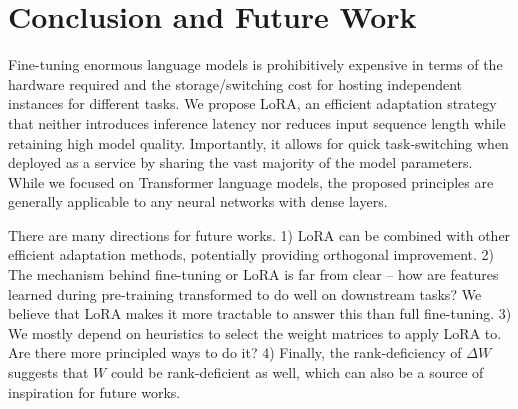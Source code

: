 \section{Conclusion and Future Work}

Fine-tuning enormous language models is prohibitively expensive in terms of the hardware required and the storage/switching cost for hosting independent instances for different tasks. We propose LoRA, an efficient adaptation strategy that neither introduces inference latency nor reduces input sequence length while retaining high model quality. Importantly, it allows for quick task-switching when deployed as a service by sharing the vast majority of the model parameters. While we focused on Transformer language models, the proposed principles are generally applicable to any neural networks with dense layers.

There are many directions for future works. 1) LoRA can be combined with other efficient adaptation methods, potentially providing orthogonal improvement. 2) The mechanism behind fine-tuning or LoRA is far from clear -- how are features learned during pre-training transformed to do well on downstream tasks? We believe that LoRA makes it more tractable to answer this than full fine-tuning. 3) We mostly depend on heuristics to select the weight matrices to apply LoRA to. Are there more principled ways to do it? 4) Finally, the rank-deficiency of $\Delta W$ suggests that $W$ could be rank-deficient as well, which can also be a source of inspiration for future works.


